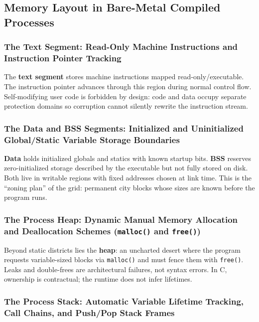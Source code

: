 \subsection{Memory Layout in Bare-Metal Compiled Processes}

\subsubsection{The Text Segment: Read-Only Machine Instructions and Instruction Pointer Tracking}

The \textbf{text segment} stores machine instructions mapped read-only/executable. The instruction pointer advances through this region during normal control flow. Self-modifying user code is forbidden by design: code and data occupy separate protection domains so corruption cannot silently rewrite the instruction stream.

\subsubsection{The Data and BSS Segments: Initialized and Uninitialized Global/Static Variable Storage Boundaries}

\textbf{Data} holds initialized globals and statics with known startup bits. \textbf{BSS} reserves zero-initialized storage described by the executable but not fully stored on disk. Both live in writable regions with fixed addresses chosen at link time. This is the ``zoning plan'' of the grid: permanent city blocks whose sizes are known before the program runs.

\subsubsection{The Process Heap: Dynamic Manual Memory Allocation and Deallocation Schemes (\texttt{malloc()} and \texttt{free()})}

Beyond static districts lies the \textbf{heap}: an uncharted desert where the program requests variable-sized blocks via \texttt{malloc()} and must fence them with \texttt{free()}. Leaks and double-frees are architectural failures, not syntax errors. In C, ownership is contractual; the runtime does not infer lifetimes.

\subsubsection{The Process Stack: Automatic Variable Lifetime Tracking, Call Chains, and Push/Pop Stack Frames}

